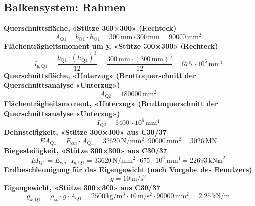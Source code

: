 \documentclass[11pt,a4paper]{article}
\begin{document}
\subsection{Balkensystem: Rahmen}
\noindent\textbf{Querschnittsfläche, «Stütze 300×300» (Rechteck)}
\begin{equation*}
A_{\text{Q1}} = b_{\text{Q1}} \cdot h_{\text{Q1}} = 300\,\mathrm{mm} \cdot 300\,\mathrm{mm} = 90000\,\mathrm{mm}^{2}
\end{equation*}
\noindent\textbf{Flächenträgheitsmoment um y, «Stütze 300×300» (Rechteck)}
\begin{equation*}
I_{y,\text{Q1}} = \frac{b_{\text{Q1}} \cdot \left(h_{\text{Q1}}\right)^{3}}{12} = \frac{300\,\mathrm{mm} \cdot \left(300\,\mathrm{mm}\right)^{3}}{12} = 675\,\cdot 10^{6}\,\mathrm{mm}^{4}
\end{equation*}
\noindent\textbf{Querschnittsfläche, «Unterzug» (Bruttoquerschnitt der Querschnittsanalyse «Unterzug»)}
\begin{equation*}
A_{\text{Q2}} = 180000\,\mathrm{mm}^{2}
\end{equation*}
\noindent\textbf{Flächenträgheitsmoment, «Unterzug» (Bruttoquerschnitt der Querschnittsanalyse «Unterzug»)}
\begin{equation*}
I_{\text{Q2}} = 5400\,\cdot 10^{6}\,\mathrm{mm}^{4}
\end{equation*}
\noindent\textbf{Dehnsteifigkeit, «Stütze 300×300» aus C30/37}
\begin{equation*}
EA_{\text{Q1}} = E_{cm} \cdot A_{\text{Q1}} = 33620\,\mathrm{N}/\mathrm{mm}^{2} \cdot 90000\,\mathrm{mm}^{2} = 3026\,\mathrm{MN}
\end{equation*}
\noindent\textbf{Biegesteifigkeit, «Stütze 300×300» aus C30/37}
\begin{equation*}
EI_{\text{Q1}} = E_{cm} \cdot I_{y,\text{Q1}} = 33620\,\mathrm{N}/\mathrm{mm}^{2} \cdot 675\,\cdot 10^{6}\,\mathrm{mm}^{4} = 22693\,\mathrm{kNm}^{2}
\end{equation*}
\noindent\textbf{Erdbeschleunigung für das Eigengewicht (nach Vorgabe des Benutzers)}
\begin{equation*}
g = 10\,\mathrm{m}/\mathrm{s}^{2}
\end{equation*}
\noindent\textbf{Eigengewicht, «Stütze 300×300» aus C30/37}
\begin{equation*}
g_{k,\text{Q1}} = \rho_{sb} \cdot g \cdot A_{\text{Q1}} = 2500\,\mathrm{kg}/\mathrm{m}^{3} \cdot 10\,\mathrm{m}/\mathrm{s}^{2} \cdot 90000\,\mathrm{mm}^{2} = 2.25\,\mathrm{kN}/\mathrm{m}
\end{equation*}
\end{document}
